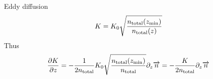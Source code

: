 Eddy diffusion 
\begin{equation}
K = K_0  \sqrt{\frac{n_\text{total}(z_\text{min})}{n_\text{total}(z)}}
\label{Titan:eddy_diff}
\end{equation}
Thus
\begin{equation}
\frac{\partial K}{\partial z} = -\frac{1}{2n_\text{total}} K_0  \sqrt{\frac{n_\text{total}(z_\text{min})}{n_\text{total}}}\partial_{z}{\overrightarrow{n}}
                = -\frac{K}{2n_\text{total}} \partial_{z}{\overrightarrow{n}}
\label{Titan:eddy_diff_deriv}
\end{equation}
